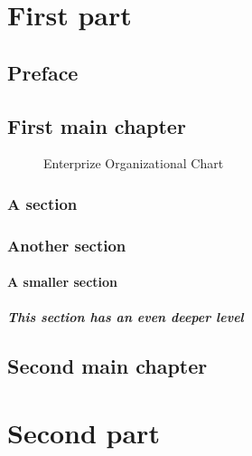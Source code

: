 \documentclass{book}
\begin{document}
\tableofcontents
\listoffigures
\listoftables
\part{First part}

\chapter*{Preface}              %




\chapter{First main chapter}
\begin{figure}
  \centering
  \caption{Enterprize Organizational Chart}
\end{figure}

\section{A section}

\section{Another section}

\subsection{A smaller section}

\subsubsection[Deeper level]{This section has an even deeper level} %

\chapter{Second main chapter}

\part{Second part}
\end{document}
